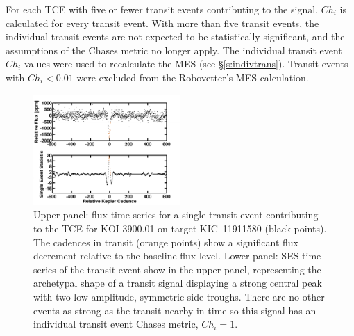 
For each TCE with five or fewer transit events contributing to the signal, $Ch_{i}$ is calculated for every transit event.  With more than five transit events, the individual transit events are not expected to be statistically significant, and the assumptions of the Chases metric no longer apply. The individual transit event $Ch_{i}$ values were used to recalculate the MES (see \S\ref{s:indivtrans}). Transit events with $Ch_{i}<0.01$ were excluded from the Robovetter's MES calculation.

\begin{figure}[htb]
\includegraphics[width=0.5\textwidth]{kic11911580_cleanhighsnr.pdf}
\caption{Upper panel: flux time series for a single transit event contributing to the TCE for KOI 3900.01 on target KIC~11911580 (black points).  The cadences in transit (orange points) show a significant flux decrement relative to the baseline flux level.  Lower panel: SES time series of the transit event show in the upper panel, representing the archetypal shape of a transit signal displaying a strong central peak with two low-amplitude, symmetric side troughs. There are no other events as strong as the transit nearby in time so this signal has an individual transit event Chases metric, $Ch_{i}=1$.}
\label{fig:chases1}
\end{figure}

